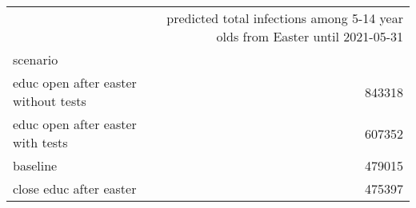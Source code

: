\begin{tabular}{lr}
\toprule
{} &  predicted total infections among 5-14 year olds from Easter until 2021-05-31 \\
scenario                               &                                                                               \\
\midrule
 educ open after easter  without tests &                                             843318 \\
 educ open after easter  with tests    &                                             607352 \\
 baseline                              &                                             479015 \\
 close educ after easter               &                                             475397 \\
\bottomrule
\end{tabular}
